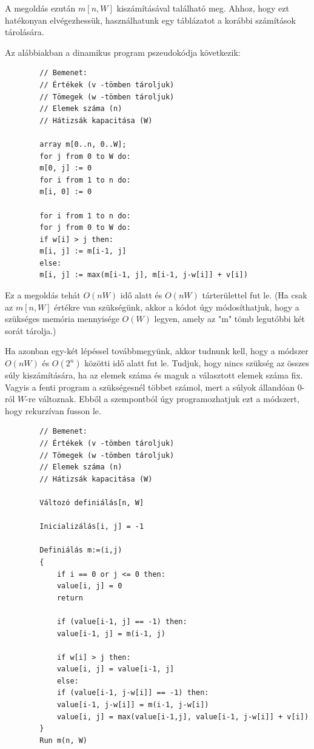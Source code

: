 	A megoldás ezután $m[n,W]$ kiszámításával található meg. Ahhoz, hogy ezt hatékonyan elvégezhessük, használhatunk egy táblázatot a korábbi számítások tárolására.
	
	Az alábbiakban a dinamikus program pszeudokódja következik: 
	
	\begin{verbatim}
		// Bemenet:
		// Értékek (v -tömben tároljuk)
		// Tömegek (w -tömben tároljuk)
		// Elemek száma (n)
		// Hátizsák kapacitása (W)
		
		array m[0..n, 0..W];
		for j from 0 to W do:
		m[0, j] := 0
		for i from 1 to n do:
		m[i, 0] := 0
		
		for i from 1 to n do:
		for j from 0 to W do:
		if w[i] > j then:
		m[i, j] := m[i-1, j]
		else:
		m[i, j] := max(m[i-1, j], m[i-1, j-w[i]] + v[i])
	\end{verbatim}
	
	Ez a megoldás tehát $O(nW)$ idő alatt és $O(nW)$ tárterülettel fut le. (Ha csak az $m[n,W]$ értékre van szükségünk, akkor a kódot úgy módosíthatjuk, hogy a szükséges memória mennyisége $O(W)$ legyen, amely az "m" tömb legutóbbi két sorát tárolja.)
	
	Ha azonban egy-két lépéssel továbbmegyünk, akkor tudnunk kell, hogy a módszer $O(nW)$ és $O(2^n)$ közötti idő alatt fut le. Tudjuk, hogy nincs szükség az összes súly kiszámítására, ha az elemek száma és maguk a választott elemek száma fix. Vagyis a fenti program a szükségesnél többet számol, mert a súlyok állandóan $0$-ról $W$-re változnak. Ebből a szempontból úgy programozhatjuk ezt a módszert, hogy rekurzívan fusson le. 
	
	\begin{verbatim}
		// Bemenet:
		// Értékek (v -tömben tároljuk)
		// Tömegek (w -tömben tároljuk)
		// Elemek száma (n)
		// Hátizsák kapacitása (W)
		
		Változó definiálás[n, W]
		
		Inicializálás[i, j] = -1
		
		Definiálás m:=(i,j)
		{
			if i == 0 or j <= 0 then:
			value[i, j] = 0
			return
			
			if (value[i-1, j] == -1) then:     
			value[i-1, j] = m(i-1, j)
			
			if w[i] > j then:                     
			value[i, j] = value[i-1, j]
			else: 
			if (value[i-1, j-w[i]] == -1) then:    
			value[i-1, j-w[i]] = m(i-1, j-w[i])
			value[i, j] = max(value[i-1,j], value[i-1, j-w[i]] + v[i])
		}		
		Run m(n, W)
	\end{verbatim}
	
